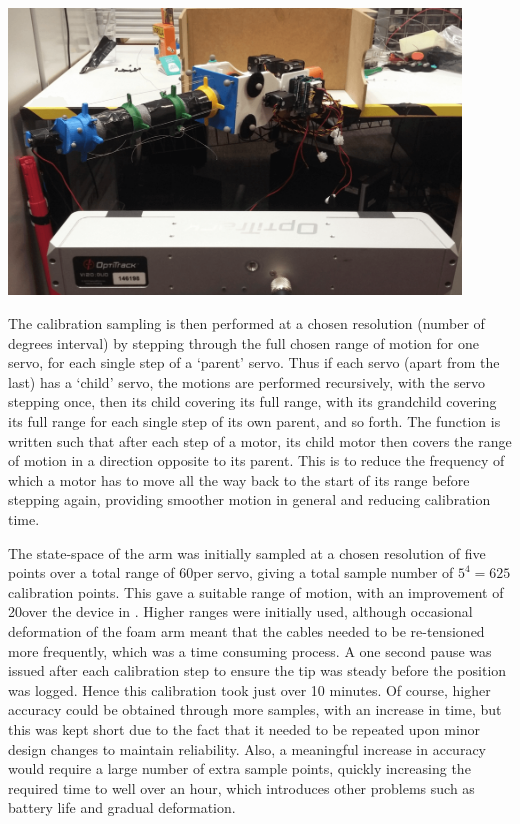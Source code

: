 \documentclass[11pt]{article}
\begin{document}
\begin{center}
\includegraphics[width=0.9\textwidth]{images/calibrationSetup.png}
\label{figure:calibrationSetup}
\end{center}

The calibration sampling is then performed at a chosen resolution (number of degrees interval) by stepping through the full chosen range of motion for one servo, for each single step of a `parent' servo. Thus if each servo (apart from the last) has a `child' servo, the motions are performed recursively, with the servo stepping once, then its child covering its full range, with its grandchild covering its full range for each single step of its own parent, and so forth. The function is written such that after each step of a motor, its child motor then covers the range of motion in a direction opposite to its parent. This is to reduce the frequency of which a motor has to move all the way back to the start of its range before stepping again, providing smoother motion in general and reducing calibration time. 

The state-space of the arm was initially sampled at a chosen resolution of five points over a total range of 60\degree per servo, giving a total sample number of $5^4 = 625$ calibration points. This gave a suitable range of motion, with an improvement of 20\degree over the device in \cite{GreggSmithDesign}. Higher ranges were initially used, although occasional deformation of the foam arm meant that the cables needed to be re-tensioned more frequently, which was a time consuming process. A one second pause was issued after each calibration step to ensure the tip was steady before the position was logged. Hence this calibration took just over 10 minutes. Of course, higher accuracy could be obtained through more samples, with an increase in time, but this was kept short due to the fact that it needed to be repeated upon minor design changes to maintain reliability. Also, a meaningful increase in accuracy would require a large number of extra sample points, quickly increasing the required time to well over an hour, which introduces other problems such as battery life and gradual deformation.
\end{document}
